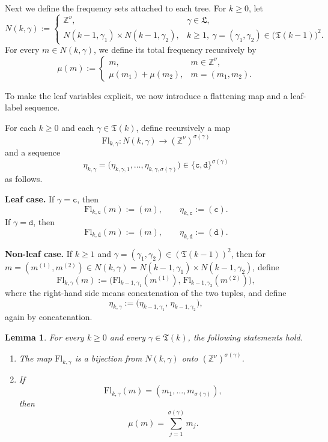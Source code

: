 \documentclass[12pt,reqno,tbtags]{amsart}
\newtheorem{lemma}{Lemma}[section]
\newcommand\1{\mathbbm{1}}
\begin{document}
Next we define the frequency sets attached to each tree. For $k\geq 0$, let
\[
N(k,\gamma):=
\begin{cases}
\mathbb{Z}^{\nu}, & \gamma\in \mathfrak{L},\\[2mm]
N(k-1,\gamma_1)\times N(k-1,\gamma_2), &
k\geq 1,\ \gamma=(\gamma_1,\gamma_2)\in \big(\mathfrak{T}(k-1)\big)^2 .
\end{cases}
\]
For every $m\in N(k,\gamma)$, we define its total frequency recursively by
\begin{equation}\label{eq:mu-definition}
\mu(m):=
\begin{cases}
m, & m\in \mathbb{Z}^{\nu},\\[1mm]
\mu(m_1)+\mu(m_2), & m=(m_1,m_2).
\end{cases}
\end{equation}

To make the leaf variables explicit, we now introduce a flattening map and a leaf-label
sequence.

For each $k\geq 0$ and each $\gamma\in\mathfrak{T}(k)$, define recursively a map
\[
\mathrm{Fl}_{k,\gamma}:N(k,\gamma)\to (\mathbb{Z}^{\nu})^{\sigma(\gamma)}
\]
and a sequence
\[
\eta_{k,\gamma}
=
\bigl(\eta_{k,\gamma,1},\dots,\eta_{k,\gamma,\sigma(\gamma)}\bigr)
\in \{\mathtt{c},\mathtt{d}\}^{\sigma(\gamma)}
\]
as follows.

\medskip
\noindent
\textbf{Leaf case.}
If $\gamma=\mathtt{c}$, then
\[
\mathrm{Fl}_{k,\mathtt{c}}(m):=(m),
\qquad
\eta_{k,\mathtt{c}}:=(\mathtt{c}).
\]
If $\gamma=\mathtt{d}$, then
\[
\mathrm{Fl}_{k,\mathtt{d}}(m):=(m),
\qquad
\eta_{k,\mathtt{d}}:=(\mathtt{d}).
\]

\medskip
\noindent
\textbf{Non-leaf case.}
If $k\geq 1$ and $\gamma=(\gamma_1,\gamma_2)\in (\mathfrak{T}(k-1))^2$, then for
$m=(m^{(1)},m^{(2)})\in N(k,\gamma)=N(k-1,\gamma_1)\times N(k-1,\gamma_2)$, define
\[
\mathrm{Fl}_{k,\gamma}(m)
:=
\bigl(\mathrm{Fl}_{k-1,\gamma_1}(m^{(1)}),\,
\mathrm{Fl}_{k-1,\gamma_2}(m^{(2)})\bigr),
\]
where the right-hand side means concatenation of the two tuples, and define
\[
\eta_{k,\gamma}
:=
\bigl(\eta_{k-1,\gamma_1},\,\eta_{k-1,\gamma_2}\bigr),
\]
again by concatenation.

\begin{lemma}\label{lem:flattening}
For every $k\geq 0$ and every $\gamma\in\mathfrak{T}(k)$, the following statements hold.

\begin{enumerate}
\item[(1)] The map $\mathrm{Fl}_{k,\gamma}$ is a bijection from $N(k,\gamma)$ onto
$(\mathbb{Z}^{\nu})^{\sigma(\gamma)}$.

\item[(2)] If
\[
\mathrm{Fl}_{k,\gamma}(m)=(m_1,\dots,m_{\sigma(\gamma)}),
\]
then
\begin{equation}\label{eq:mu-flattening}
\mu(m)=\sum_{j=1}^{\sigma(\gamma)} m_j.
\end{equation}
\end{enumerate}
\end{lemma}
\end{document}
